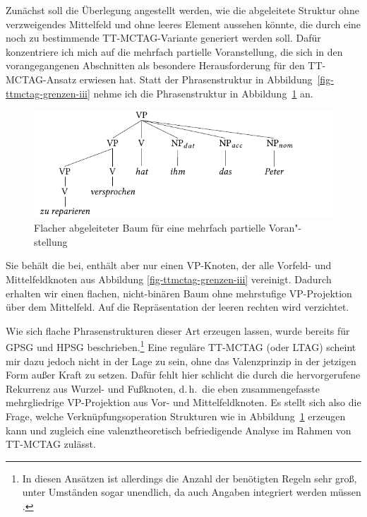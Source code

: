 Zunächst soll die Überlegung angestellt werden, wie die abgeleitete Struktur ohne verzweigendes Mittelfeld und ohne leeres Element aussehen könnte, die durch eine noch zu bestimmende TT-MCTAG-Variante generiert werden soll. Dafür konzentriere ich mich auf die mehrfach partielle Voranstellung, die sich in den vorangegangenen Abschnitten als besondere Herausforderung für den TT-MCTAG-Ansatz erwiesen hat. Statt der Phrasenstruktur in Abbildung~\ref{fig-ttmctag-grenzen-iii} nehme ich die Phrasenstruktur in Abbildung~\ref{fig-ttmctag-spinal-1} an. 
\begin{figure}[t]
\centering
\includegraphics{graphics/abb745.pdf}
\caption{\label{fig-ttmctag-spinal-1}Flacher abgeleiteter Baum für eine mehrfach partielle Voran"-stellung}
\end{figure}
Sie behält die  bei, enthält aber nur einen VP-Knoten, der alle Vorfeld- und Mittelfeldknoten aus Abbildung \ref{fig-ttmctag-grenzen-iii} vereinigt. Dadurch erhalten wir einen flachen, nicht-binären Baum ohne mehrstufige VP-Projektion über dem Mittelfeld. Auf die Repräsentation der leeren rechten  wird verzichtet.     

Wie sich flache Phrasenstrukturen dieser Art erzeugen lassen, wurde bereits für GPSG \citep{Uszkoreit:86,Uszkoreit:87} und HPSG \citep{Pollard:96} beschrieben.\footnote{In diesen Ansätzen ist allerdings die Anzahl der benötigten Regeln sehr gro\ss, unter Umständen sogar unendlich, da auch Angaben integriert werden müssen \citep[Abschnitt~2.2.1]{Mueller:04}.} Eine reguläre TT-MCTAG (oder LTAG) scheint mir dazu jedoch nicht in der Lage zu sein, ohne das Valenzprinzip in der jetzigen Form au\ss er Kraft zu setzen. Dafür fehlt hier schlicht die durch die  hervorgerufene Rekurrenz aus Wurzel- und Fu\ss knoten, d.\,h.\ die eben zusammengefasste mehrgliedrige VP-Projektion aus Vor- und Mittelfeldknoten. Es stellt sich also die Frage, welche Verknüpfungsoperation Strukturen wie in Abbildung~\ref{fig-ttmctag-spinal-1} erzeugen kann und zugleich eine valenztheoretisch befriedigende Analyse im Rahmen von TT-MCTAG zulässt.

